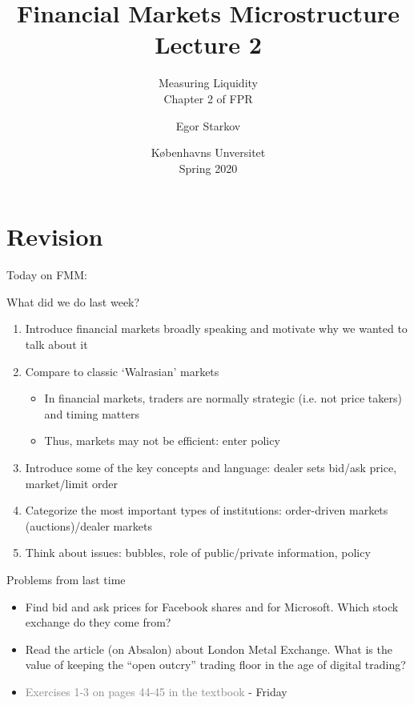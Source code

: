 \documentclass[english,10pt]{beamer}
\title{Financial Markets Microstructure \\ Lecture 2}
\subtitle{Measuring Liquidity \\
Chapter 2 of FPR}
\author{Egor Starkov}
\date{K{\o}benhavns Unversitet \\
	Spring 2020}
\begin{document}
\frame[plain]{\titlepage}
\addtocounter{framenumber}{-1}


\section{Revision}

\begin{frame}{Today on FMM:}
	\tableofcontents[currentsection]
\end{frame}


\begin{frame}{What did we do last week?}
	\begin{enumerate}
		\item Introduce financial markets broadly speaking and motivate why we wanted to talk about it
		\item Compare to classic `Walrasian' markets
		\begin{itemize}
			\item In financial markets, traders are normally strategic (i.e. not price takers) and timing matters
			\item Thus, markets may not be efficient: enter policy
		\end{itemize}
		\item Introduce some of the key concepts and language: dealer sets bid/ask price, market/limit order
		\item Categorize the most important types of institutions:  order-driven markets (auctions)/dealer markets
		\item Think about issues: bubbles, role of public/private information, policy
	\end{enumerate}
\end{frame}


\begin{frame}{Problems from last time}
	\begin{itemize}
		\item Find bid and ask prices for Facebook shares and for Microsoft. Which stock exchange do they come from? 
		\item Read the article (on Absalon) about London Metal Exchange. What is the value of keeping the ``open outcry'' trading floor in the age of digital trading?
		\item \textcolor{gray}{Exercises 1-3 on pages 44-45 in the textbook} - Friday
	\end{itemize}
\end{frame}
\end{document}
